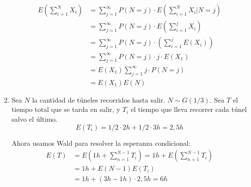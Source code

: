 \begin{enumerate}
		\begin{align*}
			E\left(\sum_{i=1}^{N}X_i\right)	& = \sum_{j=1}^{\infty} P(N=j) \cdot E\left(\sum_{i=1}^{N}X_i\Big|N=j\right)	\\
											& = \sum_{j=1}^{\infty} P(N=j) \cdot E\left(\sum_{i=1}^{j}X_i\right)			\\
											& = \sum_{j=1}^{\infty} P(N=j) \cdot \left(\sum_{i=1}^{j}E(X_i)\right)			\\
											& = \sum_{j=1}^{\infty} P(N=j) \cdot j\cdot E(X_1)			\\
											& = E(X_1) \sum_{j=1}^{\infty} j\cdot P(N=j)				\\
											& = E(X_1) E(N)
		\end{align*}
	\item
		Sea $N$ la cantidad de túneles recorridos hasta salir. $N\sim G(1/3)$.
		Sea $T$ el tiempo total que se tarda en salir, y $T_i$ el tiempo que lleva recorrer cada túnel salvo el último.
		$$E(T_i) = 1/2\cdot 2h + 1/2\cdot 3h = 2,5h$$
		
		Ahora usamos Wald para resolver la esperanza condicional:
		\begin{align*}
			E(T)	& = E\left(1h + \sum_{n=1}^{N-1}T_i\right) = 1h + E\left(\sum_{n=1}^{N-1}T_i\right)	\\
					& = 1h + E(N-1)E(T_i)	\\
					& = 1h + (3h-1h)\cdot 2,5h = 6h
		\end{align*}
\end{enumerate}
